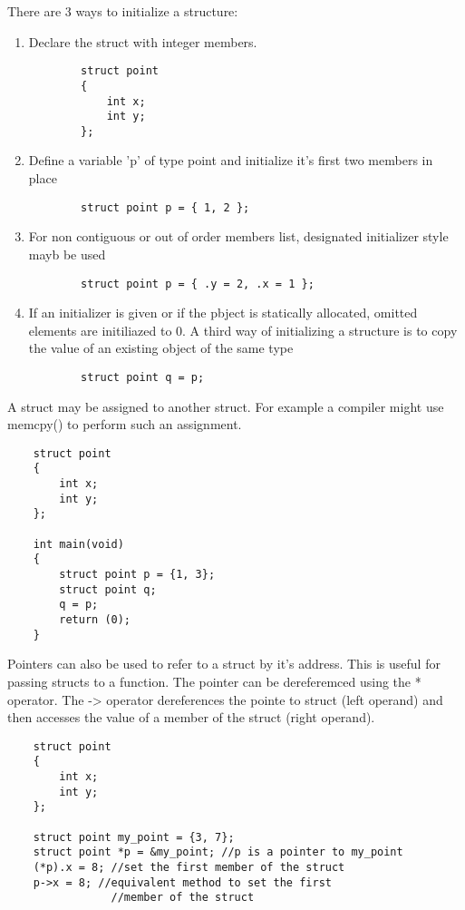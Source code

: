 \documentclass[
	12pt, %
]{fphw}
\begin{document}
\par There are 3 ways to initialize a structure:
\begin{enumerate}
	\item Declare the struct with integer members.
		\begin{lstlisting}
		struct point
		{
			int x;
			int y;
		};
		\end{lstlisting}
	\item Define a variable 'p' of type point and initialize it's first two members in place
		\begin{lstlisting}
		struct point p = { 1, 2 };
		\end{lstlisting}
	\item For non contiguous or out of order members list, designated initializer style mayb be used
		\begin{lstlisting}
		struct point p = { .y = 2, .x = 1 };
		\end{lstlisting}
	\item If an initializer is given or if the pbject is statically allocated, omitted elements are initiliazed to 0.
		A third way of initializing a structure is to copy the value of an existing object of the same type
		\begin{lstlisting}
		struct point q = p;
		\end{lstlisting}
\end{enumerate}

\par A struct may be assigned to another struct. For example a compiler might use memcpy() to perform such an assignment.
\begin{lstlisting}
	struct point
	{
		int x;
		int y;
	};

	int main(void)
	{
		struct point p = {1, 3};
		struct point q;
		q = p;
		return (0);
	}
\end{lstlisting}

Pointers can also be used to refer to a struct by it's address. This is useful for
passing structs to a function. The pointer can be dereferemced using the * operator.
The -> operator dereferences the pointe to struct (left operand) and then accesses
the value of a member of the struct (right operand).
\begin{lstlisting}
	struct point
	{
		int x;
		int y;
	};

	struct point my_point = {3, 7};
	struct point *p = &my_point; //p is a pointer to my_point
	(*p).x = 8; //set the first member of the struct
	p->x = 8; //equivalent method to set the first 
				//member of the struct
\end{lstlisting}
\end{document}
